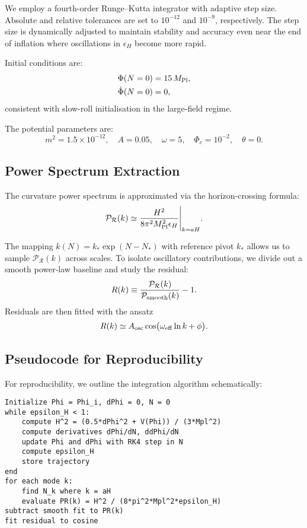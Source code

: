 \documentclass[reprint, amsmath, amssymb, aps, prd, nofootinbib]{revtex4-2}
\begin{document}
We employ a fourth-order Runge--Kutta integrator with adaptive step size.
Absolute and relative tolerances are set to $10^{-12}$ and $10^{-9}$, respectively.
The step size is dynamically adjusted to maintain stability and accuracy even near the end of inflation where oscillations in $\epsilon_H$ become more rapid.

Initial conditions are:
\begin{align}
\Phi(N=0) &= 15\,M_{\rm Pl}, \\
\dot\Phi(N=0) &= 0,
\end{align}
consistent with slow-roll initialisation in the large-field regime.

The potential parameters are:
\begin{equation}
m^2 = 1.5\times 10^{-12}, \quad
A = 0.05, \quad
\omega = 5, \quad
\Phi_c = 10^{-2}, \quad
\theta = 0.
\end{equation}

\subsection{Power Spectrum Extraction}

The curvature power spectrum is approximated via the horizon-crossing formula:
\begin{equation}
\mathcal{P}_\mathcal{R}(k) \simeq \frac{H^2}{8 \pi^2 M_{\rm Pl}^2 \epsilon_H}
\Bigg|_{k=aH}.
\end{equation}

The mapping $k(N) = k_* \exp(N-N_*)$ with reference pivot $k_*$ allows us to sample $\mathcal{P}_\mathcal{R}(k)$ across scales.
To isolate oscillatory contributions, we divide out a smooth power-law baseline and study the residual:
\begin{equation}
R(k) \equiv \frac{\mathcal{P}_\mathcal{R}(k)}{\mathcal{P}_{\rm smooth}(k)} - 1.
\end{equation}
Residuals are then fitted with the ansatz
\begin{equation}
R(k) \simeq A_{\rm osc} \cos\!\big(\omega_{\rm eff}\ln k + \phi\big).
\end{equation}

\subsection{Pseudocode for Reproducibility}

For reproducibility, we outline the integration algorithm schematically:

\begin{verbatim}
Initialize Phi = Phi_i, dPhi = 0, N = 0
while epsilon_H < 1:
    compute H^2 = (0.5*dPhi^2 + V(Phi)) / (3*Mpl^2)
    compute derivatives dPhi/dN, ddPhi/dN
    update Phi and dPhi with RK4 step in N
    compute epsilon_H
    store trajectory
end
for each mode k:
    find N_k where k = aH
    evaluate PR(k) = H^2 / (8*pi^2*Mpl^2*epsilon_H)
subtract smooth fit to PR(k)
fit residual to cosine
\end{verbatim}
\end{document}
